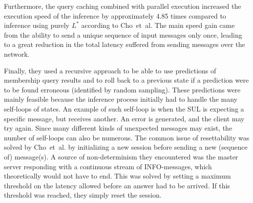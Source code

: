 \documentclass[multi,crop=false,class=article]{standalone}
\begin{document}
Furthermore, the query caching combined with parallel execution increased the
execution speed of the inference by approximately 4.85 times compared to
inference using purely $L^*$ according to Cho~et~al. The main speed gain came
from the ability to send a unique sequence of input messages only once, leading
to a great reduction in the total latency suffered from sending messages over
the network.

Finally, they used a recursive approach to be able to use predictions of
membership query results and to roll back to a previous state if a prediction
were to be found erroneous (identified by random sampling). These predictions
were mainly feasible because the inference process initially had to handle the
many self-loops of states. An example of such self-loop is when the SUL is
expecting a specific message, but receives another. An error is generated, and
the client may try again. Since many different kinds of unexpected messages may
exist, the number of self-loops can also be numerous. The common issue of
resettability was solved by Cho~et~al. by initializing a new session before
sending a new (sequence of) message(s). A source of non-determinism they
encountered was the master server responding with a continuous stream of
INFO-messages, which theoretically would not have to end. This was solved by
setting a maximum threshold on the latency allowed before an answer had to be
arrived. If this threshold was reached, they simply reset the session.
\end{document}

